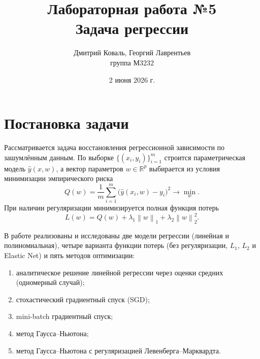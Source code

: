 \documentclass[a4paper,12pt]{article}
\title{Лабораторная работа №5\\Задача регрессии}
\author{
    Дмитрий Коваль, Георгий Лаврентьев\\
    группа М3232
}
\date{2 июня 2026 г.}
\newcommand{\R}{\mathbb{R}}
\newcommand{\norm}[1]{\left\|#1\right\|}
\theoremstyle{definition}
\begin{document}
\maketitle
\vspace{-20pt}

\section{Постановка задачи}

Рассматривается задача восстановления регрессионной зависимости по зашумлённым данным. По выборке
$\{(x_i, y_i)\}_{i=1}^{m}$ строится параметрическая модель $\widehat{y}(x, w)$, а вектор параметров
$w \in \R^p$ выбирается из условия минимизации эмпирического риска
\[
    Q(w) = \frac{1}{m} \sum_{i=1}^{m} \bigl(\widehat{y}(x_i, w) - y_i\bigr)^2 \longrightarrow \min_{w}.
\]
При наличии регуляризации минимизируется полная функция потерь
\[
    L(w) = Q(w) + \lambda_1 \norm{w}_1 + \lambda_2 \norm{w}_2^2.
\]

В работе реализованы и исследованы две модели регрессии (линейная и полиномиальная),
четыре варианта функции потерь (без регуляризации, $L_1$, $L_2$ и Elastic Net) и пять методов
оптимизации:
\begin{enumerate}
    \item аналитическое решение линейной регрессии через оценки средних (одномерный случай);
    \item стохастический градиентный спуск (SGD);
    \item mini-batch градиентный спуск;
    \item метод Гаусса--Ньютона;
    \item метод Гаусса--Ньютона с регуляризацией Левенберга--Марквардта.
\end{enumerate}
\end{document}
